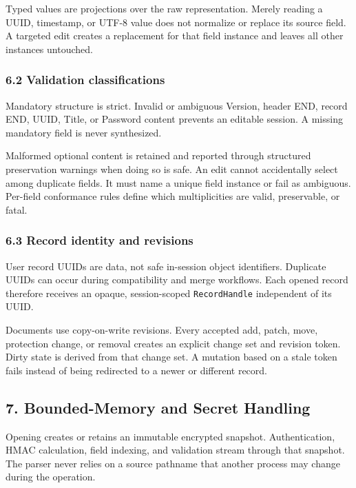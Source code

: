 \documentclass[
  letterpaper,
]{article}
\begin{document}
Typed values are projections over the raw representation. Merely reading a UUID, timestamp, or UTF-8 value does not
normalize or replace its source field. A targeted edit creates a replacement for that field instance and leaves all
other instances untouched.

\subsubsection{6.2 Validation classifications}\label{62-validation-classifications}

Mandatory structure is strict. Invalid or ambiguous Version, header END, record END, UUID, Title, or Password content
prevents an editable session. A missing mandatory field is never synthesized.

Malformed optional content is retained and reported through structured preservation warnings when doing so is safe. An
edit cannot accidentally select among duplicate fields. It must name a unique field instance or fail as ambiguous.
Per-field conformance rules define which multiplicities are valid, preservable, or fatal.

\subsubsection{6.3 Record identity and revisions}\label{63-record-identity-and-revisions}

User record UUIDs are data, not safe in-session object identifiers. Duplicate UUIDs can occur during compatibility and
merge workflows. Each opened record therefore receives an opaque, session-scoped \nolinkurl{RecordHandle} independent of
its UUID.

Documents use copy-on-write revisions. Every accepted add, patch, move, protection change, or removal creates an
explicit change set and revision token. Dirty state is derived from that change set. A mutation based on a stale token
fails instead of being redirected to a newer or different record.

\subsection{7. Bounded-Memory and Secret Handling}\label{7-bounded-memory-and-secret-handling}

Opening creates or retains an immutable encrypted snapshot. Authentication, HMAC calculation, field indexing, and
validation stream through that snapshot. The parser never relies on a source pathname that another process may change
during the operation.
\end{document}
